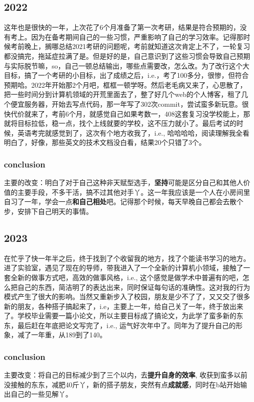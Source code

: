 \documentclass{article}
\begin{document}
\subsection{2022}
这年也是很快的一年，上次花了6个月准备了第一次考研，结果是符合预期的，没有考上。因为在备考期间自己的一些习惯，严重影响了自己的学习效率。记得那时候考前晚上，搁哪总结2021考研的问题呢，考前就知道这次肯定上不了，一轮复习都没搞完，拖延症拉满了是。但是好的是，自己意识到了这些习惯会导致自己预期与实际脱节嘛，so，自己一顿总结输出，哪些点需要改，怎么改。为了改行这个大目标，搞了一个考研的小目标，出了成绩之后，i.e.，考了100多分，很惨，但符合预期哈。2022年开始那2个月吧，框框一顿学呀。然后老毛病又来了，心思散了，把一些时间分到计算机领域的开荒里面去了，整了好几个web的个人博客，租了几个便宜服务器，开始去写点代码，那一年写了302次commit，尝试蛮多新玩意。很快代价就来了，考前6个月，就感觉自己如果考数一，408这套复习没学校能上，那就将目标拉低，稳一点，找个上线就要的学校，这不压力就小了。最后考试的时候，英语考完就感觉到了，这次有个地方收我了，i.e., 哈哈哈哈，阅读理解我全看明白了，好像，那些英文的技术文档没白看，结果20个只错了3个。

\subsubsection*{conclusion}
主要的改变：明白了对于自己这种非天赋型选手，\textbf{坚持}可能是区分自己和其他人价值的主要手段，不多干活，搞不过其他对手丫。这一年我应该是一个人在小房间里自习了一年，学会一点\textbf{和自己相处}吧。记得那个时候，每天早晚自己都会去散个步，安排下自己明天的事情。

\subsection{2023}
在忙乎了快一年半之后，终于找到了个收留我的地方，找了个能读书学习的地方。进了实验室，遇见了现在的导师，带我进入了一个全新的计算机小领域，接触了一套全新的做事方式吧，高效的做事风格，i.e., 这个感觉是做学术中普遍有的吧，怎么把自己的东西，简洁明了的表达出来，同时保证每句话的准确性。这对我的行为模式产生了很大的影响。当然又重新步入了校园，朋友是少不了了，又又交了很多新的朋友，各种搭子搞起来了，i.e，主要上一年，给自己关了一年，终于放出来了。学校毕业需要一篇小论文，所以主要目标成了搞论文，为此学了蛮多新的东东，最后赶在年底把论文写完了，i.e., 运气好次年中了。同年为了提升自己的形象，减了一年重，从189到了140。
\subsubsection*{conclusion}
主要改变：将自己的目标减少到了三个以内，去\textbf{提升自身的效率}, 收获到蛮多以前没接触的东东，减肥40斤丫，新的搭子朋友，突然有点\textbf{成就感}，同时在b站开始输出自己的一些见解丫。
\end{document}
